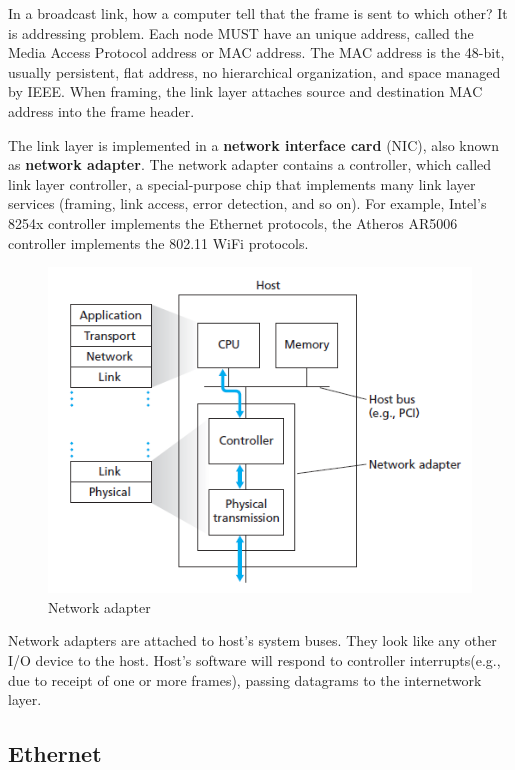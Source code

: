 \documentclass[a4paper, 11pt]{article}
\begin{document}
In a broadcast link, how a computer tell that the frame is sent to which other? It is addressing problem. Each node MUST have an unique address, called the Media Access Protocol address or MAC address. The MAC address is the 48-bit, usually persistent, flat address, no hierarchical organization, and space managed by IEEE. When framing, the link layer attaches source and destination MAC address into the frame header.

The link layer is implemented in a \textbf{network interface card} (NIC), also known as \textbf{network adapter}. The network adapter contains a controller, which called link layer controller, a special-purpose chip that implements many link layer services (framing, link access, error detection, and so on). For example, Intel’s 8254x controller implements the Ethernet protocols, the Atheros AR5006 controller implements the 802.11 WiFi protocols. \\

\begin{figure}[h]
\includegraphics[scale=0.8]{network-adapter.png}
\caption{Network adapter}
\end{figure}

Network adapters are attached to host's system buses. They look like any other I/O device to the host. Host's software will respond to controller interrupts(e.g., due to receipt of one or more frames), passing datagrams to the internetwork layer.

\subsection{Ethernet}
\end{document}
